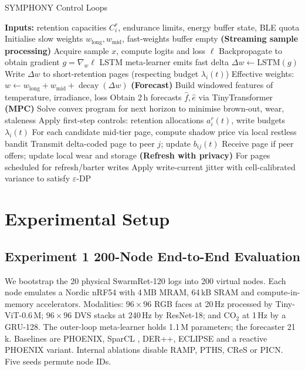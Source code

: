\documentclass{article}
\begin{document}
\begin{algorithm}[H]
\caption{SYMPHONY Control Loops}
\begin{algorithmic}[1]
\State \textbf{Inputs:} retention capacities $C_{i}^{r}$, endurance limits, energy buffer state, BLE quota
\State Initialise slow weights $w_{\mathrm{long}}, w_{\mathrm{mid}}$, fast-weights buffer empty
  \State \textbf{(Streaming sample processing)}
  \State Acquire sample $x$, compute logits and loss $\ell$
  \State Backpropagate to obtain gradient $g = \nabla_{w} \ell$
  \State LSTM meta-learner emits fast delta $\Delta w \leftarrow \mathrm{LSTM}(g)$
  \State Write $\Delta w$ to short-retention pages (respecting budget $\lambda_{i}(t)$)
  \State Effective weights: $w \leftarrow w_{\mathrm{long}} + w_{\mathrm{mid}} + \operatorname{decay}(\Delta w)$
     \State \textbf{(Forecast)} Build windowed features of temperature, irradiance, loss
     \State Obtain 2\,h forecasts $\hat{f},\hat{e}$ via TinyTransformer
     \State \textbf{(MPC)} Solve convex program for next horizon to minimise brown-out, wear, staleness
     \State Apply first-step controls: retention allocations $a_{i}^{r}(t)$, write budgets $\lambda_{i}(t)$
  \EndIf
     \State For each candidate mid-tier page, compute shadow price via local restless bandit
        \State Transmit delta-coded page to peer $j$; update $b_{ij}(t)$
        \State Receive page if peer offers; update local wear and storage
     \EndIf
  \EndIf
  \State \textbf{(Refresh with privacy)} For pages scheduled for refresh/barter writes
  \State \quad Apply write-current jitter with cell-calibrated variance to satisfy $\varepsilon$-DP
\EndWhile
\end{algorithmic}
\end{algorithm}

\section{Experimental Setup}\label{sec:setup}
\subsection{Experiment 1 \textendash{} 200-Node End-to-End Evaluation}
We bootstrap the 20 physical SwarmRet-120 logs into 200 virtual nodes. Each node emulates a Nordic nRF54 with 4\,MB MRAM, 64\,kB SRAM and compute-in-memory accelerators. Modalities: $96\times96$ RGB faces at 20\,Hz processed by Tiny-ViT-0.6\,M; $96\times96$ DVS stacks at 240\,Hz by ResNet-18; and CO$_2$ at 1\,Hz by a GRU-128. The outer-loop meta-learner holds 1.1\,M parameters; the forecaster 21\,k. Baselines are PHOENIX, SparCL \cite{wang-2022-sparcl}, DER++, ECLIPSE and a reactive PHOENIX variant. Internal ablations disable RAMP, PTHS, CReS or PICN. Five seeds permute node IDs.
\end{document}
